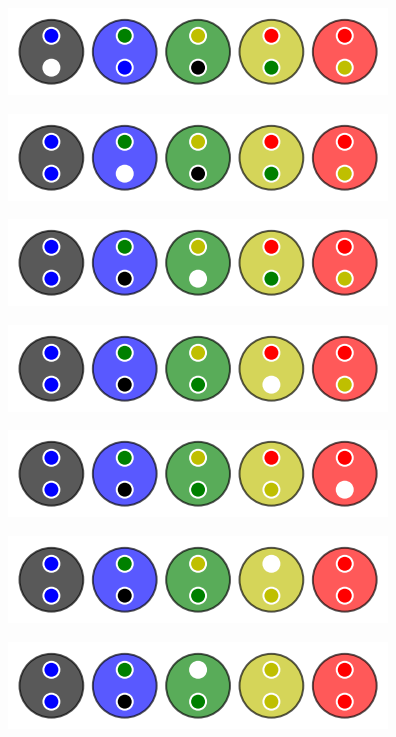 \begin{multicols}{2}
\begin{center}
        \includegraphics[scale= 0.45]{content/algo_bubble/example/007.png}
    \end{center}

    \columnbreak

    \begin{center}
        \includegraphics[scale= 0.45]{content/algo_bubble/example/008.png}

        \includegraphics[scale= 0.45]{content/algo_bubble/example/009.png}

        \includegraphics[scale= 0.45]{content/algo_bubble/example/010.png}

        \includegraphics[scale= 0.45]{content/algo_bubble/example/011.png}

        \includegraphics[scale= 0.45]{content/algo_bubble/example/012.png}

        \includegraphics[scale= 0.45]{content/algo_bubble/example/013.png}


\end{center}
\end{multicols}

